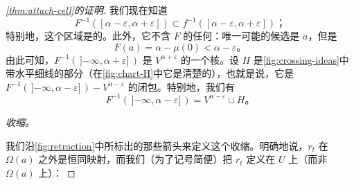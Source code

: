 \begin{proof}[\cref{thm:attach-cell}的证明]
我们现在知道
\[
F^{-1}([\alpha-\varepsilon,\alpha+\varepsilon])\subset f^{-1}([\alpha-\varepsilon,\alpha+\varepsilon])\text{；}
\]
特别地，这个区域是\trCompact{}的。此外，它不含 $F$ 的任何\trCriticalPoint：唯一可能的候选是 $a$，但是
\[
F(a)=\alpha-\mu(0)<\alpha-\varepsilon\text{。}
\]
由此可知，$F^{-1}(\,]{-\infty},\alpha+\varepsilon]\,)$ 是 $V^{\alpha+\varepsilon}$ 的一个\trDeformationRetract{}核。设 $H$ 是\cref{fig:crossing-ideas}中带水平细线的部分（在\cref{fig:chart-H}中它是清楚的），也就是说，它是 $F^{-1}(\,]{-\infty},\alpha-\varepsilon]\,)-V^{\alpha-\varepsilon}$ 的闭包。特别地，我们有
\[
F^{-1}(\,]{-\infty},\alpha-\varepsilon]\,)=V^{\alpha-\varepsilon}\cup H\text{。}
\]

\emph{收缩。}

我们沿\cref{fig:retraction}中所标出的那些箭头来定义这个收缩。明确地说，$r_t$ 在 $\Omega(a)$ 之外是恒同映射，而我们（为了记号简便）把 $r_t$ 定义在 $U$ 上（而非 $\Omega(a)$ 上）：


\end{proof}
